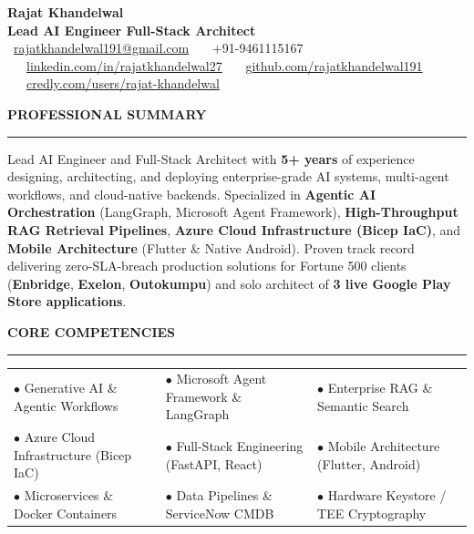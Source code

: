 \documentclass[10pt,a4paper]{article}
\newcommand{\sectiontitle}[1]{%
    \vspace{4pt}
    {\normalsize\textbf{\uppercase{\textcolor{primary}{#1}}}}
    \vspace{-3pt}
    \par\textcolor{primary}{\rule{\textwidth}{0.6pt}}
    \vspace{2pt}
}
\begin{document}
\begin{center}
    {\LARGE\textbf{\textcolor{primary}{Rajat Khandelwal}}}\\[2pt]
    {\small\textbf{\textcolor{subtitle}{Lead AI Engineer \quad\textbar\quad Full-Stack Architect}}}\\[3pt]
    {\footnotesize
        \faEnvelope\ \href{mailto:rajatkhandelwal191@gmail.com}{rajatkhandelwal191@gmail.com} \ \textbar\ 
        \faPhone*\ +91-9461115167 \ \textbar\ 
        \faLinkedin\ \href{https://linkedin.com/in/rajatkhandelwal27}{linkedin.com/in/rajatkhandelwal27} \ \textbar\ 
        \faGithub\ \href{https://github.com/rajatkhandelwal191}{github.com/rajatkhandelwal191} \ \textbar\ 
        \faCertificate\ \href{https://www.credly.com/users/rajat-khandelwal.b764d962}{credly.com/users/rajat-khandelwal}
    }
\end{center}

\vspace{-5pt}

\sectiontitle{Professional Summary}
{\small Lead AI Engineer and Full-Stack Architect with \textbf{5+ years} of experience designing, architecting, and deploying enterprise-grade AI systems, multi-agent workflows, and cloud-native backends. Specialized in \textbf{Agentic AI Orchestration} (LangGraph, Microsoft Agent Framework), \textbf{High-Throughput RAG Retrieval Pipelines}, \textbf{Azure Cloud Infrastructure (Bicep IaC)}, and \textbf{Mobile Architecture} (Flutter \& Native Android). Proven track record delivering zero-SLA-breach production solutions for Fortune 500 clients (\textbf{Enbridge}, \textbf{Exelon}, \textbf{Outokumpu}) and solo architect of \textbf{3 live Google Play Store applications}.}

\sectiontitle{Core Competencies}
{\footnotesize
\begin{tabularx}{\textwidth}{@{} >{\raggedright\arraybackslash}X >{\raggedright\arraybackslash}X >{\raggedright\arraybackslash}X @{}}
$\bullet$ Generative AI \& Agentic Workflows & $\bullet$ Microsoft Agent Framework \& LangGraph & $\bullet$ Enterprise RAG \& Semantic Search \\
$\bullet$ Azure Cloud Infrastructure (Bicep IaC) & $\bullet$ Full-Stack Engineering (FastAPI, React) & $\bullet$ Mobile Architecture (Flutter, Android) \\
$\bullet$ Microservices \& Docker Containers & $\bullet$ Data Pipelines \& ServiceNow CMDB & $\bullet$ Hardware Keystore / TEE Cryptography
\end{tabularx}
}
\end{document}

